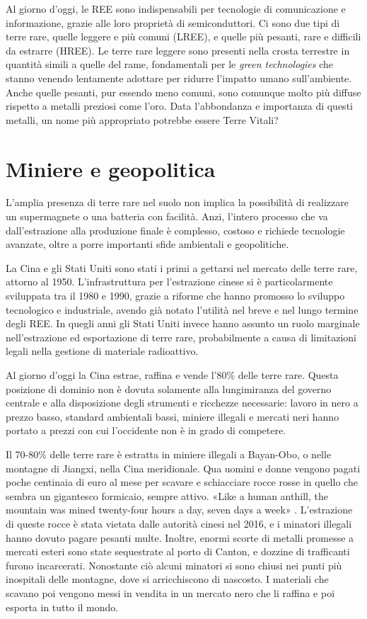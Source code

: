 \documentclass[12pt,a4paper,oneside]{book}
\begin{document}
Al giorno d'oggi, le REE sono indispensabili per tecnologie di comunicazione e informazione, grazie alle loro proprietà di semiconduttori. Ci sono due tipi di terre rare, quelle leggere e più comuni (LREE), e quelle più pesanti, rare e difficili da estrarre (HREE). Le terre rare leggere sono presenti nella crosta terrestre in quantità simili a quelle del rame, fondamentali per le \textit{green technologies} che stanno venendo lentamente adottare per ridurre l'impatto umano sull'ambiente. Anche quelle pesanti, pur essendo meno comuni, sono comunque molto più diffuse rispetto a metalli preziosi come l'oro.
Data l'abbondanza e importanza di questi metalli, un nome più appropriato potrebbe essere Terre Vitali?

\section{Miniere e geopolitica}
L'amplia presenza di terre rare nel suolo non implica la possibilità di realizzare un supermagnete o una batteria con facilità. Anzi, l'intero processo che va dall'estrazione alla produzione finale è complesso, costoso e richiede tecnologie avanzate, oltre a porre importanti sfide ambientali e geopolitiche.

La Cina e gli Stati Uniti sono stati i primi a gettarsi nel mercato delle terre rare, attorno al 1950. L'infrastruttura per l'estrazione cinese si è particolarmente sviluppata tra il 1980 e 1990, grazie a riforme che hanno promosso lo sviluppo tecnologico e industriale, avendo già notato l'utilità nel breve e nel lungo termine degli REE. In quegli anni gli Stati Uniti invece hanno assunto un ruolo marginale nell'estrazione ed esportazione di terre rare, probabilmente a causa di limitazioni legali nella gestione di materiale radioattivo.

Al giorno d'oggi la Cina estrae, raffina e vende l'80\% delle terre rare. Questa posizione di dominio non è dovuta solamente alla lungimiranza del governo centrale e alla disposizione degli strumenti e ricchezze necessarie: lavoro in nero a prezzo basso, standard ambientali bassi, miniere illegali e mercati neri hanno portato a prezzi con cui l'occidente non è in grado di competere. 

Il 70-80\% delle terre rare è estratta in miniere illegali a Bayan-Obo, o nelle montagne di Jiangxi, nella Cina meridionale. Qua uomini e donne vengono pagati poche centinaia di euro al mese per scavare e schiacciare rocce rosse in quello che sembra un gigantesco formicaio, sempre attivo.
«Like a human anthill, the mountain was mined twenty-four hours a day, seven days a week» \citep[p. 24]{pitron2020rare}.
L'estrazione di queste rocce è stata vietata dalle autorità cinesi nel 2016, e i minatori illegali hanno dovuto pagare pesanti multe. Inoltre, enormi scorte di metalli promesse a mercati esteri sono state sequestrate al porto di Canton, e dozzine di trafficanti furono incarcerati.
Nonostante ciò alcuni minatori si sono chiusi nei punti più inospitali delle montagne, dove si arricchiscono di nascosto. I materiali che scavano poi vengono messi in vendita in un mercato nero che li raffina e poi esporta in tutto il mondo.
\end{document}
